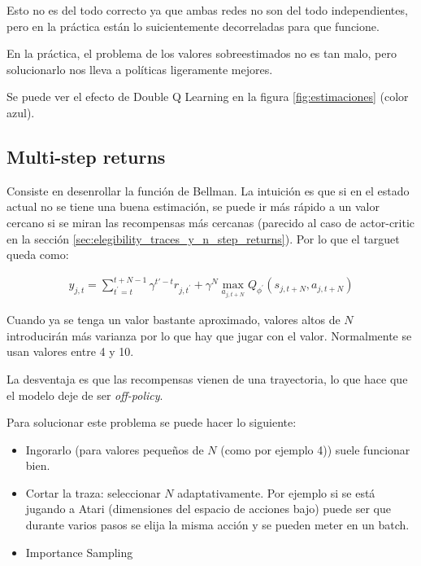 Esto no es del todo correcto ya que ambas redes no son del todo independientes, pero
en la práctica están lo suicientemente decorreladas para que funcione.

En la práctica, el problema de los valores sobreestimados no es tan malo, pero solucionarlo
nos lleva a políticas ligeramente mejores.

Se puede ver el efecto de Double Q Learning en la figura \ref{fig:estimaciones} (color
azul).

\subsection{Multi-step returns}%
\label{sub:multi_step_returns}

Consiste en desenrollar la función de Bellman. La intuición es que si en el estado actual no se
tiene una buena estimación, se puede ir más rápido a un valor cercano si se miran las
recompensas más cercanas (parecido al caso de actor-critic en la sección
\ref{sec:elegibility_traces_y_n_step_returns}). Por lo que el targuet queda como:

\begin{align}
    y _ { j , t } = \sum _ { t ^ { \prime } = t } ^ { t + N - 1 } \gamma^{t'-t}r _ { j , t ^ { \prime } } + \gamma ^ { N } \operatorname { max } _ { a _ { j , t + N } } Q _ { \phi ^ { \prime } } ( s _ { j , t + N } , a _ { j , t + N } )
\end{align}

Cuando ya se tenga un valor bastante aproximado, valores altos de $N$ introducirán más
varianza por lo que hay que jugar con el valor. Normalmente se usan valores entre 4 y 10.

La desventaja es que las recompensas vienen de una trayectoria, lo que hace que el modelo deje
de ser \textit{off-policy}.

Para solucionar este problema se puede hacer lo siguiente:
\begin{itemize}
    \item Ingorarlo (para valores pequeños de $N$ (como por ejemplo 4)) suele funcionar
        bien.
    \item Cortar la traza: seleccionar $N$ adaptativamente. Por ejemplo si se está jugando a
        Atari (dimensiones del espacio de acciones bajo) puede ser que durante varios pasos
        se elija la misma acción y se pueden meter en un batch.
    \item Importance Sampling
\end{itemize}

